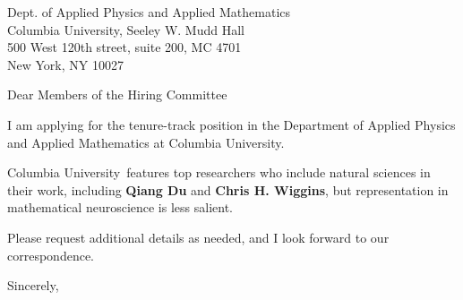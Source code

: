 




	
	
	\def\School{Columbia University}
	
	\begin{letter}
		{Dept. of Applied Physics and Applied Mathematics\\
			Columbia University, Seeley W. Mudd Hall\\
			500 West 120th street, suite 200, MC 4701\\
			New York, NY 10027
		}
		
		\opening{Dear Members of the Hiring Committee}
		
		
		I am applying for the tenure-track position in the Department of Applied Physics and Applied Mathematics at \School. 
		
		
		
		\School~features top researchers who include natural sciences in their work, including \textbf{Qiang Du} and \textbf{Chris H. Wiggins}, but representation in mathematical neuroscience is less salient. 
		
		
		
		
		
		Please request additional details as needed, and I look forward to our correspondence.
		
		\closing{Sincerely,}
	\end{letter}
